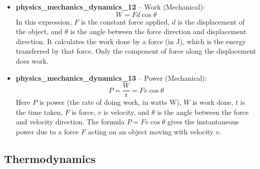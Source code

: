 \documentclass[11pt,a4paper]{article}
\begin{document}
\begin{itemize}
\item \textbf{physics\_mechanics\_dynamics\_12} -- Work (Mechanical): 
\[W = Fd \cos\theta\]
In this expression, $F$ is the constant force applied, $d$ is the displacement of the object, and $\theta$ is the angle between the force direction and displacement direction. It calculates the work done by a force (in J), which is the energy transferred by that force. Only the component of force along the displacement does work.

\item \textbf{physics\_mechanics\_dynamics\_13} -- Power (Mechanical): 
\[P = \frac{W}{t} = Fv\cos\theta\]
Here $P$ is power (the rate of doing work, in watts W), $W$ is work done, $t$ is the time taken, $F$ is force, $v$ is velocity, and $\theta$ is the angle between the force and velocity direction. The formula $P=Fv\cos\theta$ gives the instantaneous power due to a force $F$ acting on an object moving with velocity $v$.
\end{itemize}

\subsection{Thermodynamics}
\end{document}

